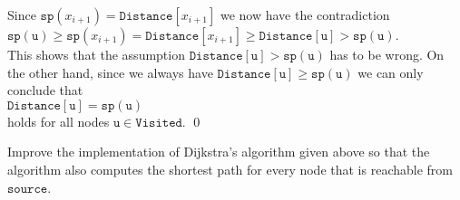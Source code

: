 \begin{enumerate}
      Since $\mathtt{sp}(x_{i+1}) = \mathtt{Distance}[x_{i+1}]$ we now have the contradiction
      \\[0.2cm]
      \hspace*{1.3cm} 
      $\mathtt{sp(u)} \geq \mathtt{sp}(x_{i+1}) = \mathtt{Distance}[x_{i+1}] \geq \mathtt{Distance[u]} > \mathtt{sp(u)}$.
      \\[0.2cm]
      This shows that the assumption $\mathtt{Distance[u]} > \mathtt{sp(u)}$ has to be wrong.  On the
      other hand, since we always have $\mathtt{Distance[u]} \geq \mathtt{sp(u)}$ we can only conclude that
      \\[0.2cm]
      \hspace*{1.3cm}
      $\mathtt{Distance[u]} = \mathtt{sp(u)}$
      \\[0.2cm]
      holds for all nodes $\mathtt{u} \in \mathtt{Visited}$. \qed
\end{enumerate}

\exercise
Improve the implementation of Dijkstra's algorithm given above so that the algorithm also computes
the shortest path for every node that is reachable from $\mathtt{source}$.
\eox


